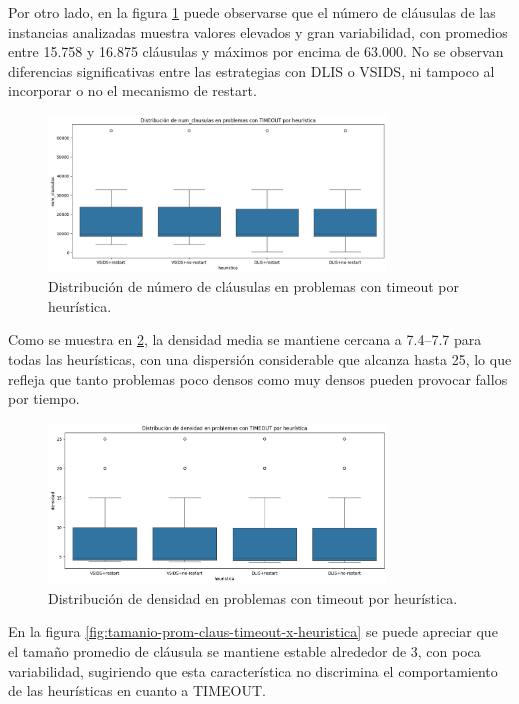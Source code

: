 Por otro lado, en la figura \ref{fig:num-claus-timeout-x-heuristica} puede observarse que el n\'umero de cl\'ausulas de las instancias analizadas muestra valores elevados y gran variabilidad, con promedios entre 15.758 y 16.875 cl\'ausulas y m\'aximos por encima de 63.000. No se observan diferencias significativas entre las estrategias con DLIS o VSIDS, ni tampoco al incorporar o no el mecanismo de restart.

\begin{figure}[ht]
    \centering
    \includegraphics[width=0.8\textwidth]{Graphics/num_claus_timeout_x_heuristica.png}
    \caption{Distribuci\'on de n\'umero de cl\'ausulas en problemas con timeout por heur\'istica.}
    \label{fig:num-claus-timeout-x-heuristica}
\end{figure}

Como se muestra en \ref{fig:densidad-timeout-x-heuristica}, la densidad media se mantiene cercana a 7.4–7.7 para todas las heurísticas, con una dispersión considerable que alcanza hasta 25, lo que refleja que tanto problemas poco densos como muy densos pueden provocar fallos por tiempo.

\begin{figure}[ht]
    \centering
    \includegraphics[width=0.8\textwidth]{Graphics/densidad_timeout_x_heuristica.png}
    \caption{Distribuci\'on de densidad en problemas con timeout por heur\'istica.}
    \label{fig:densidad-timeout-x-heuristica}
\end{figure}

En la figura \ref{fig:tamanio-prom-claus-timeout-x-heuristica} se puede apreciar que el tamaño promedio de cláusula se mantiene estable alrededor de 3, con poca variabilidad, sugiriendo que esta característica no discrimina el comportamiento de las heurísticas en cuanto a TIMEOUT.

